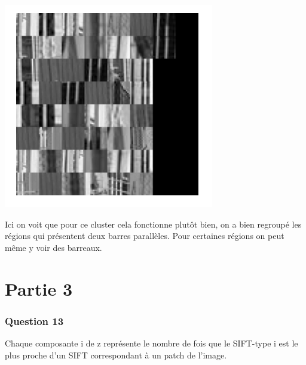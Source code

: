 \documentclass[11pt]{article}
\begin{document}
\includegraphics{q12_1}

Ici on voit que pour ce cluster cela fonctionne plutôt bien, on a bien regroupé les régions qui présentent deux barres parallèles. Pour certaines régions on peut même y voir des barreaux.

\part*{\Large Partie 3}
\section*{\large Question 13}
Chaque composante i de z représente le nombre de fois que le SIFT-type i est le plus proche d'un SIFT correspondant à un patch de l'image.
\end{document}
